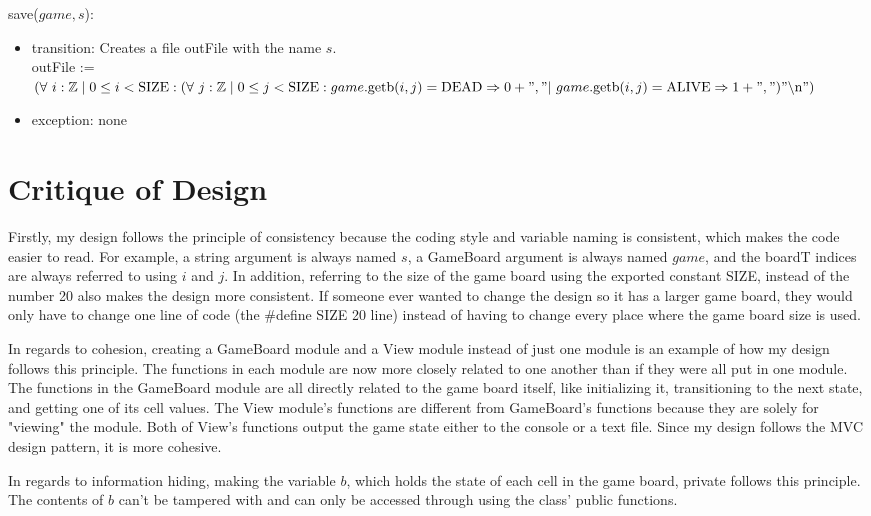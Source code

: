 \documentclass[12pt]{article}
\begin{document}
\noindent save($game, s$):
\begin{itemize}
\item transition: Creates a file outFile with the name $s$.\\
outFile := $(\forall \ i : \mathbb{Z} \mid 0 \le i < \mbox{SIZE}: (\forall \ j : \mathbb{Z} \mid 0 \le j < \mbox{SIZE}: game.\mbox{getb}(i, j) = \mbox{DEAD} \Rightarrow 0 + "," | \ game.\mbox{getb}(i, j) = \mbox{ALIVE} \Rightarrow 1 + ",") "\backslash \text{n}")$
\item exception: none
\end{itemize}

\newpage

\section*{Critique of Design}

\indent Firstly, my design follows the principle of consistency because the coding style and variable naming is consistent, which makes the code easier to read. For example, a string argument is always named $s$, a GameBoard argument is always named $game$, and the boardT indices are always referred to using $i$ and $j$. In addition, referring to the size of the game board using the exported constant SIZE, instead of the number 20 also makes the design more consistent. If someone ever wanted to change the design so it has a larger game board, they would only have to change one line of code (the \#define SIZE 20 line) instead of having to change every place where the game board size is used.

\medskip

\indent In regards to cohesion, creating a GameBoard module and a View module instead of just one module is an example of how my design follows this principle. The functions in each module are now more closely related to one another than if they were all put in one module. The functions in the GameBoard module are all directly related to the game board itself, like initializing it, transitioning to the next state, and getting one of its cell values. The View module's functions are different from GameBoard's functions because they are solely for "viewing" the module. Both of View's functions output the game state either to the console or a text file. Since my design follows the MVC design pattern, it is more cohesive. 

\medskip

\indent In regards to information hiding, making the variable $b$, which holds the state of each cell in the game board, private follows this principle. The contents of $b$ can't be tampered with and can only be accessed through using the class' public functions. 
\end{document}
